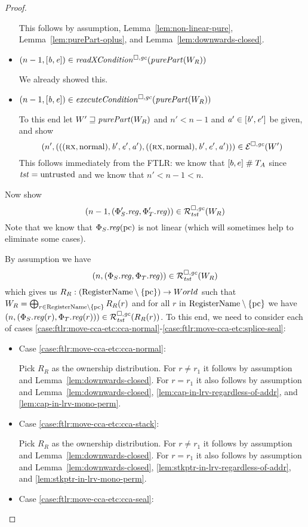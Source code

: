 \begin{proof}
\begin{itemize}
    This follows by assumption, Lemma~\ref{lem:non-linear-pure}, Lemma~\ref{lem:purePart-oplus}, and Lemma~\ref{lem:downwards-closed}.
  \item $\npair[n-1]{[\baddr,\eaddr]} \in \xReadCond{}(\purePart{W_R})$

    We already showed this.
  \item $\npair[n-1]{[\baddr,\eaddr]} \in \execCond{}(\purePart{W_R})$

    To this end let $W' \future \purePart{W_R}$ and $n' < n-1$ and $\aaddr' \in [\baddr',\eaddr']$ be given, and show
    \[
      \npair[n']{(((\rx,\normal),\baddr',\eaddr',\aaddr'),((\rx,\normal),\baddr',\eaddr',\aaddr'))} \in \lre(W')
    \]
    This follows immediately from the FTLR: we know that $[b,e] \mathrel{\#} \ta$ since $\trust = \untrusted$ and we know that $n' < n - 1 < n$.
  \end{itemize}
  
  Now show
  \[
    \npair[n-1]{(\Phi_S'.\reg,\Phi_T'.\reg)} \in \lrrg{\trust}(W_R)
  \]
  Note that we know that $\Phi_S.\reg(\pcreg)$ is not linear (which will sometimes help to eliminate some cases).

  By assumption we have
  \[
    \npair[n]{(\Phi_S.\reg,\Phi_T.\reg)} \in \lrrg{\trust}(W_R)
  \]
  which gives us $R_R : (\RegName \setminus \{\pcreg\}) \fun World$ such that $W_R = \bigoplus_{r\in \RegName \setminus \{\pcreg\}} R_R(r)$ and for all $r$ in $\RegName \setminus \{\pcreg\}$ we have $\npair[n]{(\Phi_S.\reg(r),\Phi_T.\reg(r))} \in \lrrg{\trust}(R_R(r))$.
  To this end, we need to consider each of cases \ref{case:ftlr:move-cca-etc:cca-normal}-\ref{case:ftlr:move-cca-etc:splice-seal}:
  \begin{itemize}
  \item Case \ref{case:ftlr:move-cca-etc:cca-normal}:

    Pick $R_R$ as the ownership distribution.
    For $r \neq r_1$ it follows by assumption and Lemma~\ref{lem:downwards-closed}.
    For $r = r_1$ it also follows by assumption and Lemma~\ref{lem:downwards-closed}, \ref{lem:cap-in-lrv-regardless-of-addr}, and \ref{lem:cap-in-lrv-mono-perm}.
  \item Case \ref{case:ftlr:move-cca-etc:cca-stack}:

    Pick $R_R$ as the ownership distribution.
    For $r \neq r_1$ it follows by assumption and Lemma~\ref{lem:downwards-closed}.
    For $r = r_1$ it also follows by assumption and Lemma~\ref{lem:downwards-closed}, \ref{lem:stkptr-in-lrv-regardless-of-addr}, and \ref{lem:stkptr-in-lrv-mono-perm}.
  \item Case \ref{case:ftlr:move-cca-etc:cca-seal}:


\end{itemize}
\end{proof}
